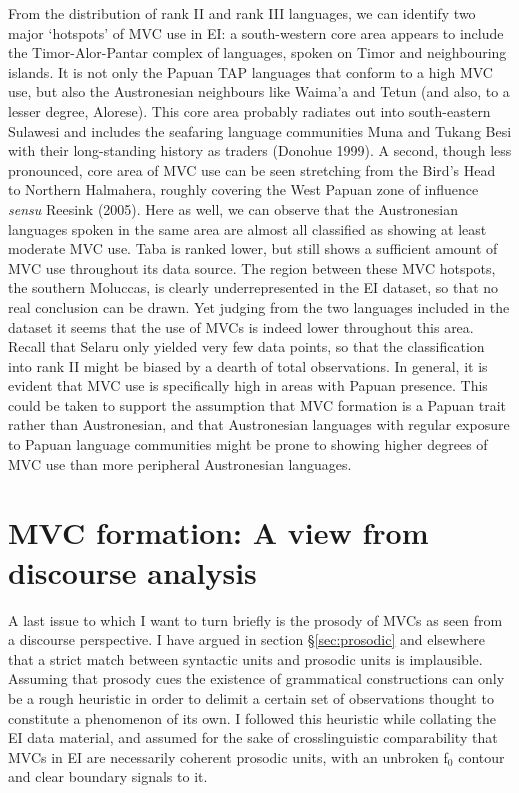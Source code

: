 From the distribution of rank II and rank III languages, we can identify two major `hotspots' of MVC use in EI: a south-western core area appears to include the Timor-Alor-Pantar complex of languages, spoken on Timor and neighbouring islands. It is not only the Papuan TAP languages that conform to a high MVC use, but also the Austronesian neighbours like Waima'a and Tetun (and also, to a lesser degree, Alorese). This core area probably radiates out into south-eastern Sulawesi and includes the seafaring language communities Muna and Tukang Besi with their long-standing history as traders (Donohue 1999). A second, though less pronounced, core area of MVC use can be seen stretching from the Bird's Head to Northern Halmahera, roughly covering the West Papuan zone of influence \textit{sensu} Reesink (2005). Here as well, we can observe that the Austronesian languages spoken in the same area are almost all classified as showing at least moderate MVC use. Taba is ranked lower, but still shows a sufficient amount of MVC use throughout its data source. The region between these MVC hotspots, the southern Moluccas, is clearly underrepresented in the EI dataset, so that no real conclusion can be drawn. Yet judging from the two languages included in the dataset it seems that the use of MVCs is indeed lower throughout this area. Recall that Selaru only yielded very few data points, so that the classification into rank II might be biased by a dearth of total observations. In general, it is evident that MVC use is specifically high in areas with Papuan presence. This could be taken to support the assumption that MVC formation is a Papuan trait rather than Austronesian, and that Austronesian languages with regular exposure to Papuan language communities might be prone to showing higher degrees of MVC use than more peripheral Austronesian languages.

\section{MVC formation: A view from discourse analysis} \label{sec:discourse}

A last issue to which I want to turn briefly is the prosody of MVCs as seen from a discourse perspective. I have argued in section §\ref{sec:prosodic} and elsewhere that a strict match between syntactic units and prosodic units is implausible. Assuming that prosody cues the existence of grammatical constructions can only be a rough heuristic in order to delimit a certain set of observations thought to constitute a phenomenon of its own. I followed this heuristic while collating the EI data material, and assumed for the sake of crosslinguistic comparability that MVCs in EI are necessarily coherent prosodic units, with an unbroken f$_0$ contour and clear boundary signals to it.

